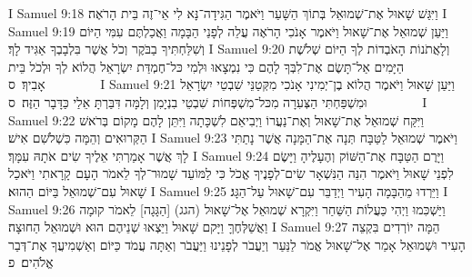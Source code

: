 I Samuel 9:18	וַיִּגַּשׁ שָׁאוּל אֶת־שְׁמוּאֵל בְּתוֹךְ הַשָּׁעַר וַיֹּאמֶר הַגִּידָה־נָּא לִי אֵי־זֶה בֵּית הָרֹאֶה׃
I Samuel 9:19	וַיַּעַן שְׁמוּאֵל אֶת־שָׁאוּל וַיֹּאמֶר אָנֹכִי הָרֹאֶה עֲלֵה לְפָנַי הַבָּמָה וַאֲכַלְתֶּם עִמִּי הַיּוֹם וְשִׁלַּחְתִּיךָ בַבֹּקֶר וְכֹל אֲשֶׁר בִּלְבָבְךָ אַגִּיד לָךְ׃
I Samuel 9:20	וְלָאֲתֹנוֹת הָאֹבְדוֹת לְךָ הַיּוֹם שְׁלֹשֶׁת הַיָּמִים אַל־תָּשֶׂם אֶת־לִבְּךָ לָהֶם כִּי נִמְצָאוּ וּלְמִי כּל־חֶמְדַּת יִשְׂרָאֵל הֲלוֹא לְךָ וּלְכֹל בֵּית אָבִיךָ׃ {ס}        
I Samuel 9:21	וַיַּעַן שָׁאוּל וַיֹּאמֶר הֲלוֹא בֶן־יְמִינִי אָנֹכִי מִקְּטַנֵּי שִׁבְטֵי יִשְׂרָאֵל וּמִשְׁפַּחְתִּי הַצְּעִרָה מִכּל־מִשְׁפְּחוֹת שִׁבְטֵי בִנְיָמִן וְלָמָּה דִּבַּרְתָּ אֵלַי כַּדָּבָר הַזֶּה׃ {ס}        
I Samuel 9:22	וַיִּקַּח שְׁמוּאֵל אֶת־שָׁאוּל וְאֶת־נַעֲרוֹ וַיְבִיאֵם לִשְׁכָּתָה וַיִּתֵּן לָהֶם מָקוֹם בְּרֹאשׁ הַקְּרוּאִים וְהֵמָּה כִּשְׁלֹשִׁם אִישׁ׃
I Samuel 9:23	וַיֹּאמֶר שְׁמוּאֵל לַטַּבָּח תְּנָה אֶת־הַמָּנָה אֲשֶׁר נָתַתִּי לָךְ אֲשֶׁר אָמַרְתִּי אֵלֶיךָ שִׂים אֹתָהּ עִמָּךְ׃
I Samuel 9:24	וַיָּרֶם הַטַּבָּח אֶת־הַשּׁוֹק וְהֶעָלֶיהָ וַיָּשֶׂם  לִפְנֵי שָׁאוּל וַיֹּאמֶר הִנֵּה הַנִּשְׁאָר שִׂים־לְפָנֶיךָ אֱכֹל כִּי לַמּוֹעֵד שָׁמוּר־לְךָ לֵאמֹר הָעָם  קָרָאתִי וַיֹּאכַל שָׁאוּל עִם־שְׁמוּאֵל בַּיּוֹם הַהוּא׃
I Samuel 9:25	וַיֵּרְדוּ מֵהַבָּמָה הָעִיר וַיְדַבֵּר עִם־שָׁאוּל עַל־הַגָּג׃
I Samuel 9:26	וַיַּשְׁכִּמוּ וַיְהִי כַּעֲלוֹת הַשַּׁחַר וַיִּקְרָא שְׁמוּאֵל אֶל־שָׁאוּל (הגג) [הַגָּגָה] לֵאמֹר קוּמָה וַאֲשַׁלְּחֶךָּ וַיָּקם שָׁאוּל וַיֵּצְאוּ שְׁנֵיהֶם הוּא וּשְׁמוּאֵל הַחוּצָה׃
I Samuel 9:27	הֵמָּה יוֹרְדִים בִּקְצֵה הָעִיר וּשְׁמוּאֵל אָמַר אֶל־שָׁאוּל אֱמֹר לַנַּעַר וְיַעֲבֹר לְפָנֵינוּ וַיַּעֲבֹר וְאַתָּה עֲמֹד כַּיּוֹם וְאַשְׁמִיעֲךָ אֶת־דְּבַר אֱלֹהִים׃ {פ}
